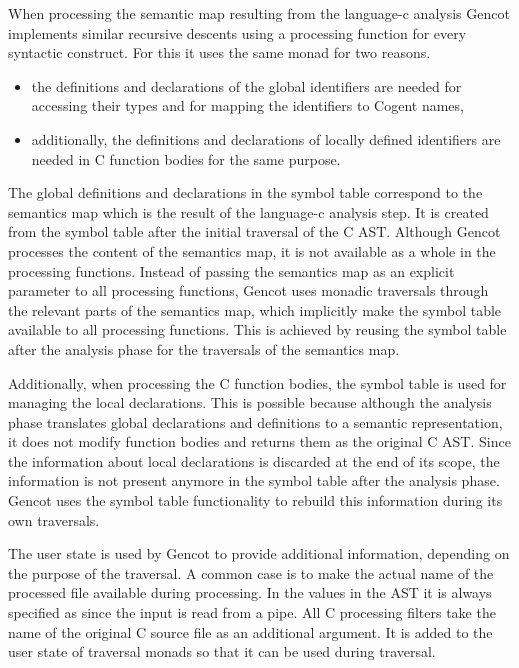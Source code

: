 When processing the semantic map resulting from the language-c analysis Gencot implements similar recursive 
descents using a processing function for every syntactic construct. For this it uses the same monad for two reasons.
\begin{itemize}
\item the definitions and declarations of the global identifiers are needed for accessing their types and for
mapping the identifiers to Cogent names,
\item additionally, the definitions and declarations of locally defined identifiers are needed in C function
bodies for the same purpose.
\end{itemize}

The global definitions and declarations in the symbol table correspond to the semantics map which is the result 
of the language-c analysis step. It is created from the symbol table after the initial traversal of the C AST. Although Gencot 
processes the content of the semantics map, it is not available as a whole in the processing functions. Instead
of passing the semantics map as an explicit parameter to all processing functions, Gencot uses monadic traversals
through the relevant parts of the semantics map, which implicitly make the symbol table available to all 
processing functions. This is achieved by reusing the symbol table after the analysis phase for the traversals
of the semantics map.

Additionally, when processing the C function bodies, the symbol table is used for managing the local declarations. 
This is possible because although the analysis phase translates global declarations and definitions to a 
semantic representation, it does not modify function bodies and returns them as the original C AST. Since
the information about local declarations is discarded at the end of its scope, the information is not 
present anymore in the symbol table after the analysis phase. Gencot uses the symbol table functionality
to rebuild this information during its own traversals.

The user state is used by Gencot to provide additional information, depending on the purpose of the traversal.
A common case is to make the actual name of the processed file available during processing. In the 
values in the AST it is always specified as  since the input is read from a pipe. All C processing 
filters take the name of the original C source file as an additional argument. It is added to the user state 
of traversal monads so that it can be used during traversal.

